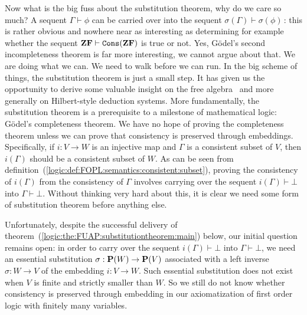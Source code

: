 Now what is the big fuss about the substitution theorem, why do we
care so much? A sequent $\Gamma\vdash\phi$ can be carried over into
the sequent $\sigma(\Gamma)\vdash\sigma(\phi)$\,: this is rather
obvious and nowhere near as interesting as determining for example
whether the sequent ${\bf ZF}\vdash\mathtt{Cons}({\bf ZF})$ is true
or not. Yes, G\"{o}del's second incompleteness theorem is far more
interesting, we cannot argue about that.  We are doing what we can.
We need to walk before we can run. In the big scheme of things, the
substitution theorem is just a small step. It has given us the
opportunity to derive some valuable insight on the free algebra
\pvs\ and more generally on Hilbert-style deduction systems. More
fundamentally, the substitution theorem is a prerequisite to a
milestone of mathematical logic: G\"{o}del's completeness theorem.
We have no hope of proving the completeness theorem unless we can
prove that consistency is preserved through embeddings.
Specifically, if $i:V\to W$ is an injective map and $\Gamma$ is a
consistent subset of $V$, then $i(\Gamma)$ should be a consistent
subset of $W$. As can be seen from
definition~(\ref{logic:def:FOPL:semantics:consistent:subset}),
proving the consistency of $i(\Gamma)$ from the consistency of
$\Gamma$ involves carrying over the sequent $i(\Gamma)\vdash\bot$
into $\Gamma\vdash\bot$. Without thinking very hard about this, it
is clear we need some form of substitution theorem before anything
else.

Unfortunately, despite the successful delivery of
theorem~(\ref{logic:the:FUAP:substitutiontheorem:main}) below, our
initial question remains open: in order to carry over the sequent
$i(\Gamma)\vdash\bot$ into $\Gamma\vdash\bot$, we need an essential
substitution $\sigma:{\bf P}(W)\to\mbox{${\bf P}(V)$}$ associated with a left
inverse $\sigma:W\to V$ of the embedding $i:V\to W$. Such essential
substitution does not exist when $V$ is finite and strictly smaller
than $W$. So we still do not know whether consistency is preserved
through embedding in our axiomatization of first order logic with
finitely many variables.

